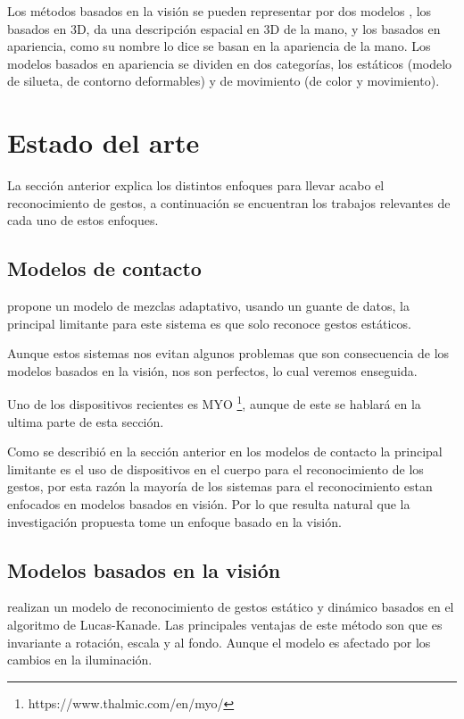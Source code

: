 Los métodos basados en la visión se pueden representar por dos modelos \citep{Rautaray2012}, los basados en 3D, da una descripción espacial en 3D de la mano, y los basados en apariencia, como su nombre lo dice se basan en la apariencia de la mano. Los modelos basados en apariencia se dividen en dos categorías, los estáticos (modelo de silueta, de contorno deformables) y de movimiento (de color y movimiento).


\section{Estado del arte}\label{sec:EstadoDelArte} 

La sección anterior explica los distintos enfoques para llevar acabo el reconocimiento de gestos, a continuación se encuentran los trabajos relevantes de cada uno de estos enfoques. 

\subsection{Modelos de contacto}

\citep{Yoon2012} propone un modelo de mezclas adaptativo, usando un guante de datos, la principal limitante para este sistema es que solo reconoce gestos estáticos. 

Aunque estos sistemas nos evitan algunos problemas que son consecuencia de los modelos basados en la visión, nos son perfectos, lo cual veremos enseguida.  

Uno de los dispositivos recientes es MYO \footnote{https://www.thalmic.com/en/myo/}, aunque de este se hablar\'a en la ultima parte de esta secci\'on. 

Como se describi\'o en la secci\'on anterior en los modelos de contacto la principal limitante es el uso de dispositivos en el cuerpo para el reconocimiento de los gestos, por esta raz\'on la mayor\'ia de los sistemas para el reconocimiento estan enfocados en modelos basados en visi\'on. Por lo que resulta natural que la investigaci\'on propuesta tome un enfoque basado en la visi\'on.

\subsection{Modelos basados en la visi\'on}  

\cite{Premaratne2013} realizan un modelo de reconocimiento de gestos est\'atico y din\'amico basados en el algoritmo de Lucas-Kanade. Las principales ventajas de este m\'etodo son que es invariante a rotaci\'on, escala y al fondo. Aunque el modelo es afectado por los cambios en la iluminaci\'on.

